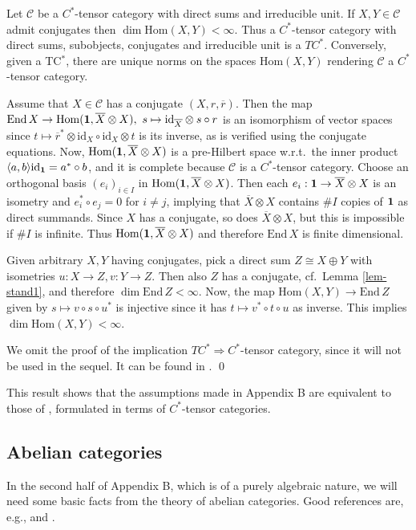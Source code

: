 \documentclass[11pt]{article}
\theoremstyle{definition}
\theoremstyle{definition}
\theoremstyle{remark}
\newcommand{\impl}{\Rightarrow}
\def\2#1{{\mathcal #1}}
\def\1#1{{\bf #1}}
\def\ol#1{{\overline #1}}
\newcommand{\Hom}{\mathrm{Hom}}
\newcommand{\End}{\mathrm{End}}
\newcommand{\mcirc}{\circ}
\newcommand{\rarr}{\rightarrow}
\def\id{\mathrm{id}}
\begin{document}
\bprop \cite{LR} Let $\2C$ be a $C^*$-tensor category with direct sums and irreducible unit. If $X,Y\in\2C$
admit conjugates then $\dim\Hom(X,Y)<\infty$. Thus a $C^*$-tensor category with direct sums,
subobjects, conjugates and irreducible unit is a $TC^*$. Conversely, given a TC$^*$, there are
unique norms on the spaces $\Hom(X,Y)$ rendering $\2C$ a $C^*$-tensor category. 
\eprop

\prf Assume that $X\in\2C$ has a conjugate $(X,r,\ol{r})$. Then the map
$\End\,X\rarr\Hom(\11,\ol{X}\otimes X),\ s\mapsto\id_{\ol{X}}\otimes s\mcirc r$ is an isomorphism of
vector spaces since $t\mapsto\ol{r}^*\otimes\id_X\mcirc\id_X\otimes t$ is its inverse, as is
verified using the conjugate equations. Now, $\Hom(\11,\ol{X}\otimes X)$ is a pre-Hilbert space w.r.t.\
the inner product $\langle a,b\rangle\id_\11=a^*\circ b$, and it is complete because $\2C$ is a
$C^*$-tensor category. Choose an orthogonal basis $(e_i)_{i\in I}$ in $\Hom(\11,\ol{X}\otimes X)$.
Then each $e_i:\11\rarr\ol{X}\otimes X$ is an isometry and $e_i^*\circ e_j=0$ for $i\ne j$, implying
that $\ol{X}\otimes X$ contains $\#I$ copies of $\11$ as direct summands. Since $X$ has a conjugate,
so does $\ol{X}\otimes X$, but this is impossible if $\#I$ is infinite. Thus 
$\Hom(\11,\ol{X}\otimes X)$ and therefore $\End\,X$ is finite dimensional.

Given arbitrary $X,Y$ having conjugates, pick a direct sum $Z\cong X\oplus Y$ with isometries
$u:X\rarr Z, v:Y\rarr Z$. Then also $Z$ has a conjugate, cf.\ Lemma \ref{lem-stand1}, and therefore
$\dim\End\,Z<\infty$. Now, the map $\Hom(X,Y)\rarr\End\,Z$ given by $s\mapsto v\circ s\circ u^*$ is
injective since it has $t\mapsto v^*\circ t\circ u$ as inverse. This implies $\dim\Hom(X,Y)<\infty$.

We omit the proof of the implication $TC^*\impl C^*$-tensor category, since it will not be used in
the sequel. It can be found in \cite{mue06}.
\qed

This result shows that the assumptions made in Appendix B are equivalent to those of \cite{DR},
formulated  in terms of $C^*$-tensor categories. 




\subsection{Abelian categories} \label{ss-abelian}
In the second half of Appendix B, which is of a purely algebraic nature, we will need some basic
facts from the theory of abelian categories. Good references are, e.g., \cite{gab} and \cite[Chapter
VIII]{cwm}.
\end{document}
